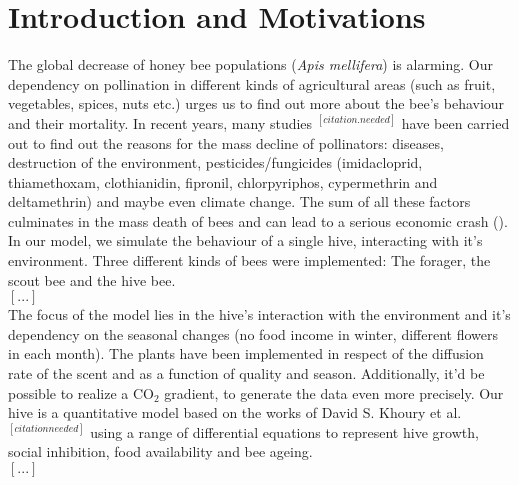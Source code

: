 \section{Introduction and Motivations}
The global decrease of honey bee populations (\textit{Apis mellifera}) is alarming. Our dependency on pollination in different kinds of agricultural areas (such as fruit, vegetables, spices, nuts etc.) urges us to find out more about the bee's behaviour and their mortality. In recent years, many studies $^{[citation.needed]}$ have been carried out to find out the reasons for the mass decline of pollinators: diseases, destruction of the environment, pesticides/fungicides (imidacloprid, thiamethoxam, clothianidin, fipronil, chlorpyriphos, cypermethrin and deltamethrin) and maybe even climate change. The sum of all these factors culminates in the mass death of bees and can lead to a serious economic crash ().\\
In our model, we simulate the behaviour of a single hive, interacting with it's environment. Three different kinds of bees were implemented: The forager, the scout bee and the hive bee. \\
$[...]$\\
The focus of the model lies in the hive's interaction with the environment and it's dependency on the seasonal changes (no food income in winter, different flowers in each month). The plants have been implemented in respect of the diffusion rate of the scent and as a function of quality and season. Additionally, it'd be possible to realize a CO$_{2}$ gradient, to generate the data even more precisely. Our hive is a quantitative model based on the works of David S. Khoury et al. $^[citation needed]$ using a range of differential equations to represent hive growth, social inhibition, food availability and bee ageing.  
\\
$[...]$\\